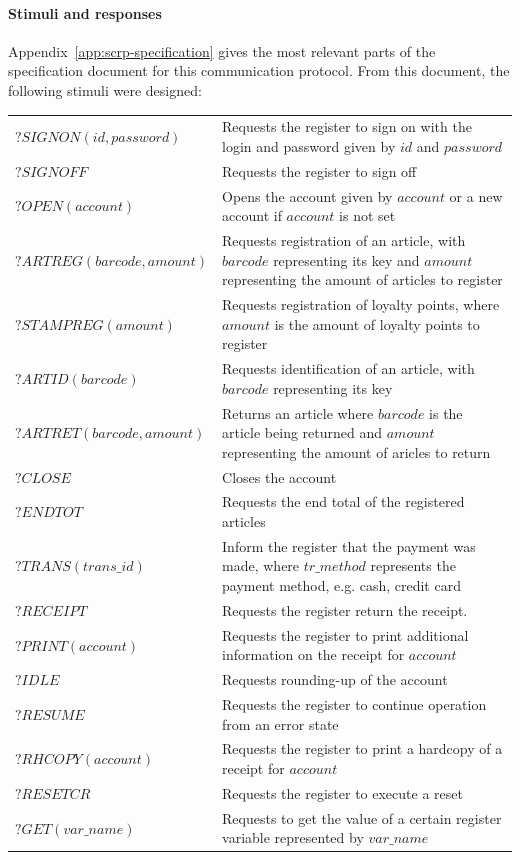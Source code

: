 \paragraph*{Stimuli and responses}
Appendix~\ref{app:scrp-specification} gives the most relevant parts of the specification document for this communication protocol. From this document, the following stimuli were designed:
\vspace{5px} \\
\begin{tabular}{lp{280px}} 
$\mathit{?SIGNON(id, password)}$ & Requests the register to sign on with the login and password given by $\mathit{id}$ and $\mathit{password}$\\
$\mathit{?SIGNOFF}$ & Requests the register to sign off\\
$\mathit{?OPEN(account)}$ & Opens the account given by $\mathit{account}$ or a new account if $\mathit{account}$ is not set\\
$\mathit{?ARTREG(barcode, amount)}$ & Requests registration of an article, with $\mathit{barcode}$ representing its key and $\mathit{amount}$ representing the amount of articles to register\\
$\mathit{?STAMPREG(amount)}$ & Requests registration of loyalty points, where $\mathit{amount}$ is the amount of loyalty points to register\\
$\mathit{?ARTID(barcode)}$ & Requests identification of an article, with $\mathit{barcode}$ representing its key\\
$\mathit{?ARTRET(barcode, amount)}$ & Returns an article where $\mathit{barcode}$ is the article being returned and $\mathit{amount}$ representing the amount of aricles to return\\
$\mathit{?CLOSE}$ & Closes the account\\
$\mathit{?ENDTOT}$ & Requests the end total of the registered articles\\
$\mathit{?TRANS(trans\_id)}$ & Inform the register that the payment was made, where $\mathit{tr\_method}$ represents the payment method, e.g. cash, credit card\\
$\mathit{?RECEIPT}$ & Requests the register return the receipt.\\
$\mathit{?PRINT(account)}$ & Requests the register to print additional information on the receipt for $\mathit{account}$\\
$\mathit{?IDLE}$ & Requests rounding-up of the account\\
$\mathit{?RESUME}$ & Requests the register to continue operation from an error state\\
$\mathit{?RHCOPY(account)}$ & Requests the register to print a hardcopy of a receipt for $\mathit{account}$\\
$\mathit{?RESETCR}$ & Requests the register to execute a reset \\
$\mathit{?GET(var\_name)}$ & Requests to get the value of a certain register variable represented by $\mathit{var\_name}$
\end{tabular}

